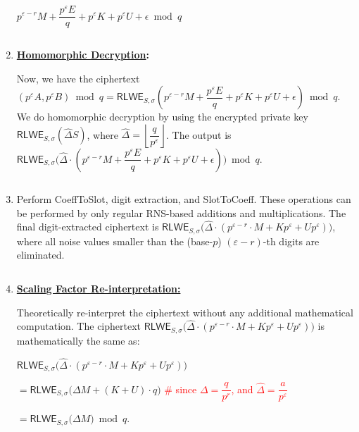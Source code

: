 \begin{enumerate}
$p^{\varepsilon - r}M + \dfrac{p^\varepsilon E}{q} + p^\varepsilon K + p^\varepsilon U +\epsilon \bmod q$

$ $

\item \textbf{\underline{Homomorphic Decryption}:} 

Now, we have the ciphertext $(p^\varepsilon A, p^\varepsilon B) \bmod q = \textsf{RLWE}_{S, \sigma}\left(p^{\varepsilon - r}M + \dfrac{p^\varepsilon E}{q} + p^\varepsilon K + p^\varepsilon U +\epsilon\right) \bmod q$. We do homomorphic decryption by using the encrypted private key $\textsf{RLWE}_{S, \sigma}(\hat\Delta S)$, where $\hat\Delta = \left\lfloor\dfrac{q}{p^\varepsilon}\right\rfloor$. The output is $\textsf{RLWE}_{S, \sigma}\bm(\hat\Delta\cdot(p^{\varepsilon - r}M + \dfrac{p^\varepsilon E}{q} + p^\varepsilon K + p^\varepsilon U +\epsilon)\bm) \bmod q$. 

$ $

\item Perform \textsf{CoeffToSlot}, digit extraction, and \textsf{SlotToCoeff}. These operations can be performed by only regular RNS-based additions and multiplications. The final digit-extracted ciphertext is $\textsf{RLWE}_{S, \sigma}\bm(\hat\Delta\cdot(p^{\varepsilon - r}\cdot M +  Kp^\varepsilon +  Up^\varepsilon)\bm)$, where all noise values smaller than the (base-$p$) $(\varepsilon-r)$-th digits are eliminated. 

$ $

\item \textbf{\underline{Scaling Factor Re-interpretation:}} 

Theoretically re-interpret the ciphertext without any additional mathematical computation. The ciphertext $\textsf{RLWE}_{S, \sigma}\bm(\hat\Delta\cdot(p^{\varepsilon - r}\cdot M +  Kp^\varepsilon +  Up^\varepsilon)\bm)$ is mathematically the same as: 

$\textsf{RLWE}_{S, \sigma}\bm(\hat\Delta\cdot(p^{\varepsilon - r}\cdot M +  Kp^\varepsilon +  Up^\varepsilon)\bm) $

$= \textsf{RLWE}_{S, \sigma}\bm(\Delta M + (K + U)\cdot q\bm) $ \textcolor{red}{ \# since $\Delta = \dfrac{q}{p^r}$, and $\hat\Delta = \dfrac{a}{p^\varepsilon}$}

$= \textsf{RLWE}_{S, \sigma}\bm(\Delta M\bm) \bmod q$.


\end{enumerate}

